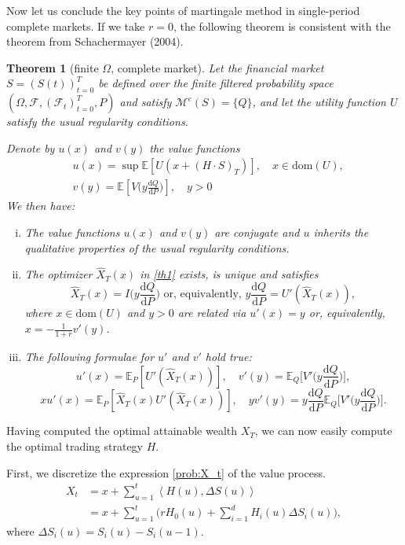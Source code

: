 \documentclass[a4paper]{article}
\newtheorem{theorem}{Theorem}[section]
\theoremstyle{definition}
\numberwithin{equation}{section}
\begin{document}
Now let us conclude the key points of martingale method in single-period complete markets. If we take $r=0$, the following theorem is consistent with the theorem from Schachermayer (2004)\cite{book paper}.

\begin{theorem}[finite $\Omega$, complete market]\label{comp}
Let the financial market $S=(S(t))^T_{t=0}$ be defined over the finite filtered probability space $(\Omega,\mathcal F,(\mathcal F_t)^T_{t=0},P)$ and satisfy $\mathcal M^e(S)=\{Q\}$, and let the utility function $U$ satisfy the usual regularity conditions.

Denote by $u(x)$ and $v(y)$ the value functions
\begin{equation}\label{th1}
\begin{aligned}
&u(x)=\sup\mathbb E[U(x+(H\cdot S)_T)],\quad x\in\text{dom}(U),
\\
&v(y)=\mathbb E[V\Big(y\frac{\mathrm dQ}{\mathrm dP}\Big)],\quad y>0
\end{aligned}
\end{equation}
We then have:
\begin{enumerate}[(i)]
\item
The value functions $u(x)$ and $v(y)$ are conjugate and $u$ inherits the qualitative properties of the usual regularity conditions.
\item
The optimizer $\hat X_T(x)$ in \eqref{th1} exists, is unique and satisfies
$$\hat X_T(x)=I\Big(y\frac{\mathrm dQ}{\mathrm dP}\Big)\text{ or, equivalently, }y\frac{\mathrm dQ}{\mathrm dP}=U'(\hat X_T(x)),$$
where $x\in\mathrm{dom}(U)$ and $y>0$ are related via $u'(x)=y$ or, equivalently, $x=-\frac{1}{1+r}v'(y)$.
\item
The following formulae for $u'$ and $v'$ hold true:
$$u'(x)=\mathbb E_P[U'(\hat X_T(x))],\quad v'(y)=\mathbb E_Q\Big[V'\Big(y\frac{\mathrm dQ}{\mathrm dP}\Big)\Big],$$
$$xu'(x)=\mathbb E_P[\hat X_T(x)U'(\hat X_T(x))],\quad yv'(y)=y\frac{\mathrm dQ}{\mathrm dP}\mathbb E_Q\Big[V'\Big(y\frac{\mathrm dQ}{\mathrm dP}\Big)\Big].$$
\end{enumerate}
\end{theorem}

Having computed the optimal attainable wealth $X_T$, we can now easily compute the optimal trading strategy $H$.

First, we discretize the expression \eqref{prob:X_t} of the value process.
\begin{equation}\nonumber
\begin{aligned}
X_t&=x+\sum^t_{u=1}\left<H(u),\Delta S(u)\right>\\
&=x+\sum^t_{u=1}\big(rH_0(u)+\sum^d_{i=1}H_i(u)\Delta S_i(u)\big),
\end{aligned}
\end{equation}
where $\Delta S_i(u)=S_i(u)-S_i(u-1)$.
\end{document}
